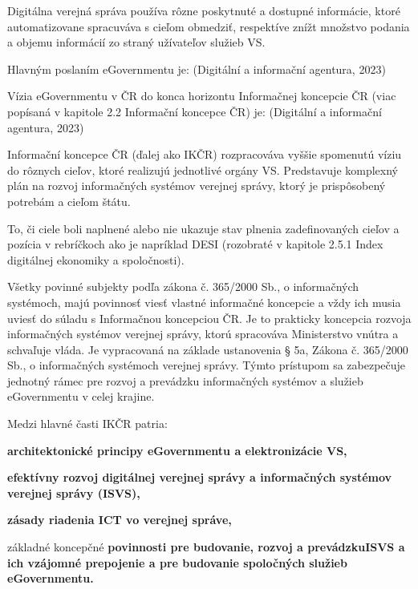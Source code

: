 Digitálna verejná správa používa rôzne poskytnuté a dostupné informácie, ktoré automatizovane spracuváva s cieľom obmedziť, respektíve znížt množstvo podania a objemu informácií zo straný užívateľov služieb VS.

Hlavným poslaním eGovernmentu je:  \scr(Digitální a informační agentura, 2023)

Vízia eGovernmentu v ČR do konca horizontu Informačnej koncepcie ČR (viac popísaná v kapitole 2.2 Informační koncepce ČR) je:  \scr(Digitální a informační agentura, 2023)

Informační koncepce ČR (ďalej ako IKČR) rozpracováva vyššie spomenutú víziu do rôznych cieľov, ktoré realizujú jednotlivé orgány VS. Predstavuje komplexný plán na rozvoj informačných systémov verejnej správy, ktorý je prispôsobený potrebám a cieľom štátu.

To, či ciele boli naplnené alebo nie ukazuje stav plnenia zadefinovaných cieľov a pozícia v rebríčkoch ako je napríklad DESI (rozobraté v kapitole 2.5.1 Index digitálnej ekonomiky a spoločnosti).

Všetky povinné subjekty podľa zákona  č. 365/2000 Sb., o informačných systémoch, majú povinnosť viesť vlastné informačné koncepcie a vždy ich musia uviesť do súladu s Informačnou koncepciou ČR. Je to prakticky koncepcia rozvoja informačných systémov verejnej správy, ktorú spracováva Ministerstvo vnútra a schvaľuje vláda. Je vypracovaná na základe ustanovenia § 5a, Zákona č. 365/2000 Sb., o informačných systémoch verejnej správy. Týmto prístupom sa zabezpečuje jednotný rámec pre rozvoj a prevádzku informačných systémov a služieb eGovernmentu v celej krajine.

\blank
Medzi hlavné časti IKČR patria:

\startitemize
\item{\start\bf architektonické principy \stop eGovernmentu a elektronizácie VS,}
\item{\start \bf efektívny rozvoj \stop digitálnej verejnej správy a informačných systémov verejnej správy (ISVS),}
\item{\start\bf zásady \stop riadenia ICT vo verejnej správe,}
\item{základné koncepčné \start \bf povinnosti \stop pre budovanie, rozvoj a prevádzku\zlom ISVS a ich vzájomné prepojenie a pre budovanie spoločných služieb eGovernmentu.}
\stopitemize

